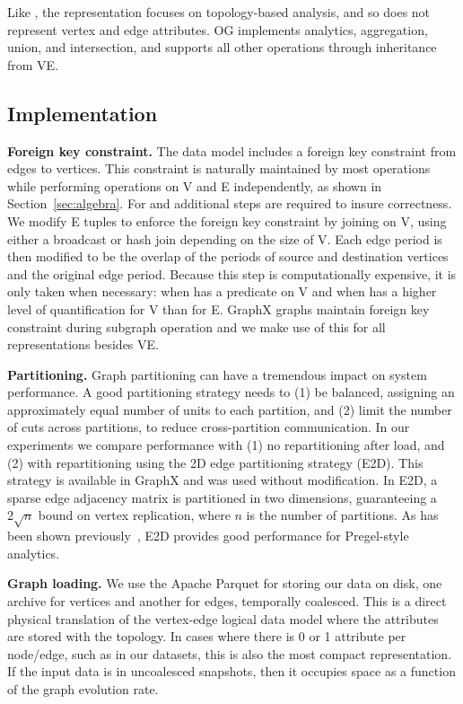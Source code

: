 Like \og, the \hg representation focuses on topology-based analysis,
and so does not represent vertex and edge attributes. OG implements
analytics, aggregation, union, and intersection, and supports all
other operations through inheritance from VE.



\subsection{Implementation}
\label{sec:sys:maint}

{\bf Foreign key constraint.}  The \ve data model includes a foreign
key constraint from edges to vertices.  This constraint is naturally
maintained by most operations while performing operations on V and E
independently, as shown in Section~\ref{sec:algebra}.  For
 and  additional steps are required
to insure correctness.  We modify E tuples to enforce the foreign key
constraint by joining on V, using either a broadcast or hash join
depending on the size of V.  Each edge period is then modified to be
the overlap of the periods of source and destination vertices and the
original edge period.  Because this step is computationally expensive,
it is only taken when necessary: when  has a predicate
on V and when  has a higher level of quantification
for V than for E.  GraphX graphs maintain foreign key constraint
during subgraph operation and we make use of this for all
representations besides VE.

{\bf Partitioning.}  Graph partitioning can have a tremendous impact
on system performance.  A good partitioning strategy needs to (1) be
balanced, assigning an approximately equal number of units to each
partition, and (2) limit the number of cuts across partitions, to
reduce cross-partition communication.  In our experiments we compare
performance with (1) no repartitioning after load, and (2) with
repartitioning using the 2D edge partitioning strategy (E2D).  This
strategy is available in GraphX and was used without modification.  In
E2D, a sparse edge adjacency matrix is partitioned in two dimensions,
guaranteeing a $2 \sqrt{n}$ bound on vertex replication, where $n$ is
the number of partitions. As has been shown
previously~\cite{DBLP:conf/osdi/GonzalezXDCFS14,MoffittTempWeb16}, E2D
provides good performance for Pregel-style analytics.

{\bf Graph loading.}  We use the Apache Parquet for storing our data
on disk, one archive for vertices and another for edges, temporally
coalesced.  This is a direct physical translation of the vertex-edge
\tg logical data model where the attributes are stored with the
topology.  In cases where there is 0 or 1 attribute per node/edge,
such as in our datasets, this is also the most compact representation.
If the input data is in uncoalesced snapshots, then it occupies space
as a function of the graph evolution rate.


